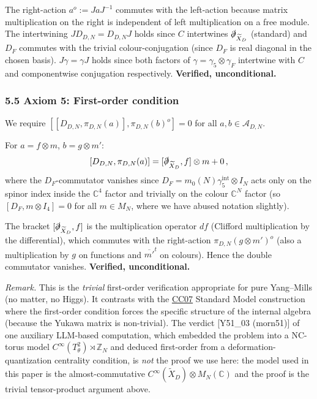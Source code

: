 \documentclass[
  11pt,
  a4paper,
]{amsart}
\begin{document}
The right-action \(a^o := JaJ^{-1}\) commutes with the left-action because
matrix multiplication on the right is independent of left multiplication on a
free module. The intertwining \(J D_{D,N} = D_{D,N} J\) holds since \(C\)
intertwines \(\slashed{\partial}_{\widetilde{X}_D}\) (standard) and \(D_F\) commutes
with the trivial colour-conjugation (since \(D_F\) is real diagonal in the chosen
basis). \(J\gamma = \gamma J\) holds since both factors of \(\gamma = \gamma_5 \otimes \gamma_F\)
intertwine with \(C\) and componentwise conjugation respectively. \textbf{Verified,
unconditional.}

\hypertarget{axiom-5-first-order-condition}{%
\subsubsection{5.5 Axiom 5: First-order condition}\label{axiom-5-first-order-condition}}

We require \([[D_{D,N}, \pi_{D,N}(a)], \pi_{D,N}(b)^o] = 0\) for all
\(a, b \in \mathcal{A}_{D,N}\).

For \(a = f \otimes m\), \(b = g \otimes m'\):
\[
[D_{D,N}, \pi_{D,N}(a)]
= [\slashed{\partial}_{\widetilde{X}_D}, f] \otimes m + 0\,,
\]
where the \(D_F\)-commutator vanishes since \(D_F = m_0(N) \gamma_5^{\mathrm{int}} \otimes I_N\)
acts only on the spinor index inside the \(\mathbb{C}^4\) factor and trivially on
the colour \(\mathbb{C}^N\) factor (so \([D_F, m \otimes I_4] = 0\) for all
\(m \in M_N\), where we have abused notation slightly).

The bracket \([\slashed{\partial}_{\widetilde{X}_D}, f]\) is the multiplication
operator \(df\) (Clifford multiplication by the differential), which commutes
with the right-action \(\pi_{D,N}(g \otimes m')^o\) (also a multiplication by
\(g\) on functions and \(\overline{m'}^t\) on colours). Hence the double
commutator vanishes. \textbf{Verified, unconditional.}

\emph{Remark.} This is the \emph{trivial} first-order verification appropriate for pure
Yang--Mills (no matter, no Higgs). It contrasts with the \href{Standard\%20Model\%20spectral\%20triple\%20on\%20$/mathbb\%7BR\%7D\%5E4\%20/otimes\%20/mathcal\%7BA\%7D_F$}{CC07} Standard Model
construction where the first-order condition forces the specific structure of
the internal algebra (because the Yukawa matrix is non-trivial). The verdict
{[}Y51\_03 (morn51){]} of one auxiliary LLM-based computation, which embedded the
problem into a NC-torus model \(C^\infty(T^2_\theta) \rtimes \mathbb{Z}_N\) and
deduced first-order from a deformation-quantization centrality condition, is
\emph{not} the proof we use here: the model used in this paper is the
almost-commutative \(C^\infty(\widetilde{X}_D) \otimes M_N(\mathbb{C})\) and the
proof is the trivial tensor-product argument above.
\end{document}
